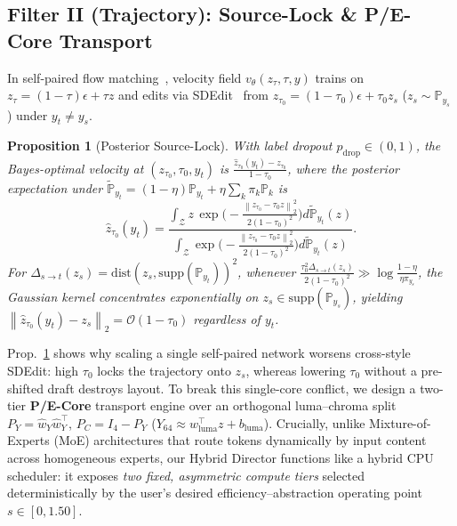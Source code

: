 \documentclass[conference]{IEEEtran}
\newtheorem{proposition}{Proposition}
\newcommand{\Prob}{\mathbb{P}}
\newcommand{\norm}[1]{\left\lVert #1 \right\rVert}
\begin{document}
\subsection{Filter II (Trajectory): Source-Lock \& P/E-Core Transport}
\label{sec:transport}

In self-paired flow matching~\cite{lipman2022flow}, velocity field $v_\theta(z_\tau,\tau,y)$ trains on $z_\tau = (1-\tau)\epsilon + \tau z$ and edits via SDEdit~\cite{meng2021sdedit} from $z_{\tau_0} = (1-\tau_0)\epsilon + \tau_0 z_s$ ($z_s\sim\Prob_{y_s}$) under $y_t \neq y_s$.

\begin{proposition}[Posterior Source-Lock]
\label{prop:sourcelock}
With label dropout $p_{\mathrm{drop}}\in(0,1)$, the Bayes-optimal velocity at $(z_{\tau_0},\tau_0,y_t)$ is $\frac{\hat{z}_{\tau_0}(y_t)-z_{\tau_0}}{1-\tau_0}$, where the posterior expectation under $\tilde{\Prob}_{y_t}=(1-\eta)\Prob_{y_t}+\eta\sum_k\pi_k\Prob_k$ is
\begin{equation}
\hat{z}_{\tau_0}(y_t) = \frac{\int_{\mathcal{Z}} z \, \exp\!\Big(-\frac{\norm{z_{\tau_0} - \tau_0 z}_2^2}{2(1-\tau_0)^2}\Big) d\tilde{\Prob}_{y_t}(z)}{\int_{\mathcal{Z}} \exp\!\Big(-\frac{\norm{z_{\tau_0} - \tau_0 z}_2^2}{2(1-\tau_0)^2}\Big) d\tilde{\Prob}_{y_t}(z)}.
\label{eq:posterior-lock}
\end{equation}
For $\Delta_{s\to t}(z_s)=\mathrm{dist}(z_s,\mathrm{supp}(\Prob_{y_t}))^2$, whenever $\frac{\tau_0^2\Delta_{s\to t}(z_s)}{2(1-\tau_0)^2} \gg \log\frac{1-\eta}{\eta\pi_{y_s}}$, the Gaussian kernel concentrates exponentially on $z_s\in\mathrm{supp}(\Prob_{y_s})$, yielding $\norm{\hat{z}_{\tau_0}(y_t)-z_s}_2=\mathcal{O}(1-\tau_0)$ regardless of $y_t$.
\end{proposition}
Prop.~\ref{prop:sourcelock} shows why scaling a single self-paired network worsens cross-style SDEdit: high $\tau_0$ locks the trajectory onto $z_s$, whereas lowering $\tau_0$ without a pre-shifted draft destroys layout. To break this single-core conflict, we design a two-tier \textbf{P/E-Core} transport engine over an orthogonal luma--chroma split $P_Y = \hat{w}_Y\hat{w}_Y^\top$, $P_C = I_4 - P_Y$ ($Y_{64}\approx w_{\mathrm{luma}}^\top z + b_{\mathrm{luma}}$). Crucially, unlike Mixture-of-Experts (MoE) architectures that route tokens dynamically by input content across homogeneous experts, our Hybrid Director functions like a hybrid CPU scheduler: it exposes \emph{two fixed, asymmetric compute tiers} selected deterministically by the user's desired efficiency--abstraction operating point $s\in[0,1.50]$.
\end{document}
